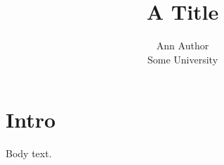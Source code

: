 \documentclass{cc}
\title{A Title}
\author{Ann Author\\ Some University\\ \email{ann@example.org}}
\begin{document}
\maketitle
\section{Intro}
Body text.
\end{document}
